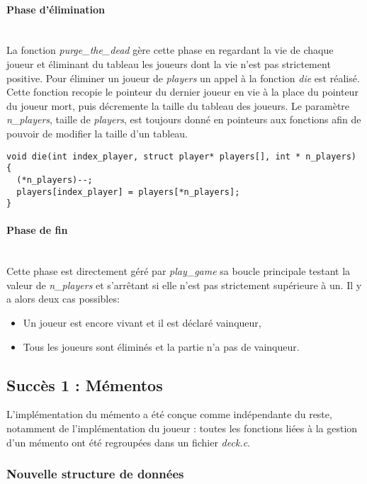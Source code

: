\documentclass[12pt]{article}
\begin{document}
\paragraph{Phase d'élimination} ~\\
\smallbreak
La fonction \textit{purge\_the\_dead} gère cette phase en regardant la vie de chaque joueur et éliminant du tableau les joueurs dont la vie n'est pas strictement positive. Pour éliminer un joueur de \textit{players} un appel à la fonction \textit{die} est réalisé. Cette fonction recopie le pointeur du dernier joueur en vie à la place du pointeur du joueur mort, puis décremente la taille du tableau des joueurs. Le paramètre \textit{n\_players}, taille de \textit{players}, est toujours donné en pointeurs aux fonctions afin de pouvoir de modifier la taille d'un tableau.

\begin{verbatim}
void die(int index_player, struct player* players[], int * n_players) {
  (*n_players)--;
  players[index_player] = players[*n_players];
}
\end{verbatim}
\smallbreak %
\paragraph{Phase de fin} ~\\
\smallbreak
Cette phase est directement géré par \textit{play\_game} sa boucle principale testant la valeur de \textit{n\_players} et s'arrêtant si elle n'est pas strictement supérieure à un.
Il y a alors deux cas possibles:
\begin{itemize}
\item Un joueur est encore vivant et il est déclaré vainqueur,
\item Tous les joueurs sont éliminés et la partie n'a pas de vainqueur.
\end{itemize}

\subsection{Succès 1 : Mémentos}

L'implémentation du mémento a été conçue comme indépendante du reste, notamment de l'implémentation du joueur : toutes les fonctions liées à la gestion d'un mémento ont été regroupées dans un fichier \textit{deck.c}.

\subsubsection{Nouvelle structure de données}
\end{document}
